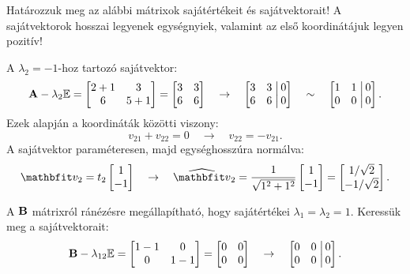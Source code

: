 \begin{exercise}{%
		Határozzuk meg az alábbi mátrixok sajátértékeit és sajátvektorait!
		A sajátvektorok hosszai legyenek egységnyiek, valamint az első koordinátájuk
		legyen pozitív!
	}
{	A $\lambda_2 = -1$-hoz tartozó sajátvektor:
	\[
		\mathbf{A} - \lambda_2 {\mathbb{E}} = \begin{bmatrix}
			2 + 1 & 3     \\
			6     & 5 + 1
		\end{bmatrix} = \begin{bmatrix}
			3 & 3 \\
			6 & 6
		\end{bmatrix}
		\quad \rightarrow \quad
		\left[\begin{matrix}
				3 & 3 \\
				6 & 6
			\end{matrix}\right.\left|\begin{matrix}
				\,0 \\ \,0
			\end{matrix}\right]
		\quad \sim \quad
		\left[\begin{matrix}
				1 & 1 \\
				0 & 0
			\end{matrix}\right.\left|\begin{matrix}
				\,0 \\ \,0
			\end{matrix}\right]
		\text{.}
	\]
	Ezek alapján a koordináták közötti viszony:
	\[
		v_{21} + v_{22} = 0
		\quad \rightarrow \quad
		v_{22} = -v_{21}
		\text{.}
	\]
	A sajátvektor paraméteresen, majd egységhosszúra normálva:
	\[
		\rvec v_2 = t_2 \begin{bmatrix}
			1 \\ -1
		\end{bmatrix}
		\quad
		\rightarrow
		\quad
		\uvec v_2 = \frac{1}{\sqrt{1^2 + 1^2}}\begin{bmatrix}
			1 \\ -1
		\end{bmatrix} = \begin{bmatrix}
			1 / \sqrt{2} \\
			-1 / \sqrt{2}
		\end{bmatrix}
		\text{.}
	\]

	\tcbline

	A $\mathbf{B}$ mátrixról ránézésre megállapítható, hogy sajátértékei $\lambda_1
		= \lambda_2 = 1$. Keressük meg a sajátvektorait:
	\[
		\mathbf{B} - \lambda_{12} {\mathbb{E}} = \begin{bmatrix}
			1 - 1 & 0     \\
			0     & 1 - 1
		\end{bmatrix} = \begin{bmatrix}
			0 & 0 \\
			0 & 0
		\end{bmatrix}
		\quad \rightarrow \quad
		\left[\begin{matrix}
				0 & 0 \\
				0 & 0
			\end{matrix}\right.\left|\begin{matrix}
				\,0 \\ \,0
			\end{matrix}\right]
		\text.
	\]

}
\end{exercise}
